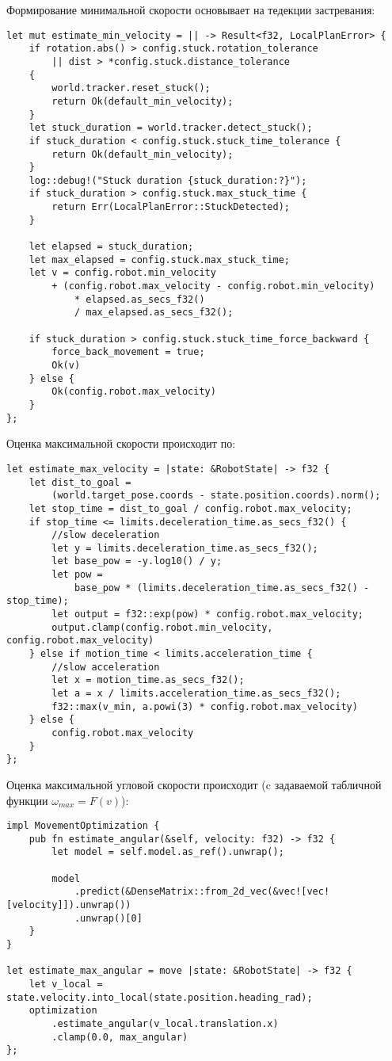 Формирование минимальной скорости основывает 
на тедекции застревания:
\begin{lstlisting}
let mut estimate_min_velocity = || -> Result<f32, LocalPlanError> {
    if rotation.abs() > config.stuck.rotation_tolerance
        || dist > *config.stuck.distance_tolerance
    {
        world.tracker.reset_stuck();
        return Ok(default_min_velocity);
    }
    let stuck_duration = world.tracker.detect_stuck();
    if stuck_duration < config.stuck.stuck_time_tolerance {
        return Ok(default_min_velocity);
    }
    log::debug!("Stuck duration {stuck_duration:?}");
    if stuck_duration > config.stuck.max_stuck_time {
        return Err(LocalPlanError::StuckDetected);
    }

    let elapsed = stuck_duration;
    let max_elapsed = config.stuck.max_stuck_time;
    let v = config.robot.min_velocity
        + (config.robot.max_velocity - config.robot.min_velocity)
            * elapsed.as_secs_f32()
            / max_elapsed.as_secs_f32();

    if stuck_duration > config.stuck.stuck_time_force_backward {
        force_back_movement = true;
        Ok(v)
    } else {
        Ok(config.robot.max_velocity)
    }
};

\end{lstlisting}

Оценка максимальной скорости происходит по:
\begin{lstlisting}
let estimate_max_velocity = |state: &RobotState| -> f32 {
    let dist_to_goal =
        (world.target_pose.coords - state.position.coords).norm();
    let stop_time = dist_to_goal / config.robot.max_velocity;
    if stop_time <= limits.deceleration_time.as_secs_f32() {
        //slow deceleration
        let y = limits.deceleration_time.as_secs_f32();
        let base_pow = -y.log10() / y;
        let pow =
            base_pow * (limits.deceleration_time.as_secs_f32() - stop_time);
        let output = f32::exp(pow) * config.robot.max_velocity;
        output.clamp(config.robot.min_velocity, config.robot.max_velocity)
    } else if motion_time < limits.acceleration_time {
        //slow acceleration
        let x = motion_time.as_secs_f32();
        let a = x / limits.acceleration_time.as_secs_f32();
        f32::max(v_min, a.powi(3) * config.robot.max_velocity)
    } else {
        config.robot.max_velocity
    }
};
\end{lstlisting}

Оценка максимальной угловой скорости происходит (c задаваемой табличной функции $\omega_{max} = F(v)$):
\begin{lstlisting}
impl MovementOptimization {
    pub fn estimate_angular(&self, velocity: f32) -> f32 {
        let model = self.model.as_ref().unwrap();

        model
            .predict(&DenseMatrix::from_2d_vec(&vec![vec![velocity]]).unwrap())
            .unwrap()[0]
    }
}

let estimate_max_angular = move |state: &RobotState| -> f32 {
    let v_local = state.velocity.into_local(state.position.heading_rad);
    optimization
        .estimate_angular(v_local.translation.x)
        .clamp(0.0, max_angular)
};
\end{lstlisting}

